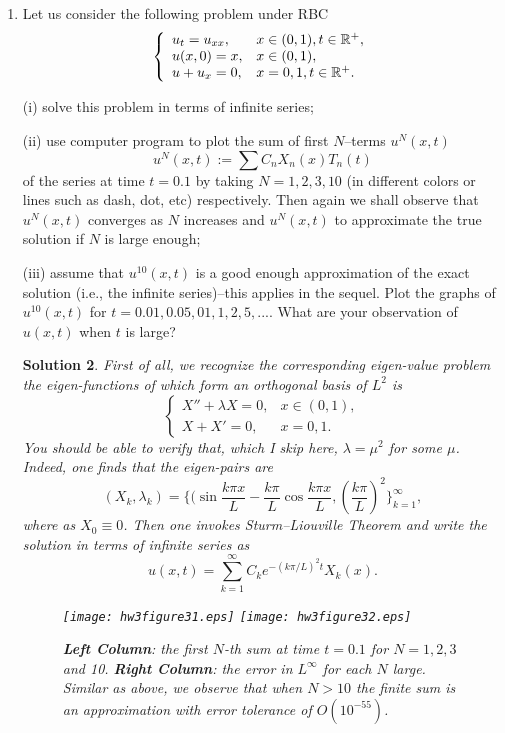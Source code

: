 \documentclass[6pt]{article}
\newtheorem{solution}{Solution}
\numberwithin{equation}{section}
\def\mathbb{\Bbb}
\begin{document}
\begin{enumerate}
\begin{solution}
I would like to comment that this explicit solution is available for this particular utility function, and in general, the PDE or HJB system can not be solved explicitly, at least NOT by the method of separation of variables.
\end{solution}



\item  Let us consider the following problem under RBC
\begin{equation}\label{NBVP1}
\left\{
\begin{array}{ll}
u_t=u_{xx},& x\in (0,1), t\in\mathbb R^+,\\
u(x,0)=x, &x\in(0,1), \\
u+u_x=0, & x=0,1, t\in\mathbb R^+.
\end{array}
\right.
\end{equation}

(i)  solve this problem in terms of infinite series;

(ii) use computer program to plot the sum of first $N$--terms $u^N(x,t)$
\[u^N(x,t):=\sum C_nX_n(x)T_n(t)\]
of the series at time $t=0.1$ by taking $N=1, 2, 3, 10$ (in different colors or lines such as dash, dot, etc) respectively.  Then again we shall observe that $u^N(x,t)$ converges as $N$ increases and $u^N(x,t)$ to approximate the true solution if $N$ is large enough;

(iii) assume that $u^{10}(x,t)$ is a good enough approximation of the exact solution (i.e., the infinite series)--this applies in the
sequel.  Plot the graphs of $u^{10}(x,t)$ for $t=0.01,0.05,01,1,2,5,...$.   What are your observation of $u(x,t)$ when $t$ is large?
\begin{solution}
First of all, we recognize the corresponding eigen-value problem the eigen-functions of which form an orthogonal basis of $L^2$ is
\[
\left\{
\begin{array}{ll}
X''+\lambda X=0,& x\in (0,1),\\
X+X'=0, & x=0,1.
\end{array}
\right.
\]
You should be able to verify that, which I skip here, $\lambda=\mu^2$ for some $\mu$.  Indeed, one finds that the eigen-pairs are
\[(X_k,\lambda_k)=\Big\{\Big(\sin \frac{k\pi x}{L}-\frac{k\pi}{L}\cos \frac{k\pi x}{L},(\frac{k\pi}{L})^2\Big\}_{k=1}^\infty,\]
where as $X_0\equiv 0$.  Then one invokes Sturm--Liouville Theorem and write the solution in terms of infinite series as
\[u(x,t)=\sum_{k=1}^\infty C_ke^{-(k\pi/L)^2t}X_k(x).\]

\begin{figure}[h!]%
  \centering
\texttt{[image: hw3figure31.eps]}\hspace{-8mm}
\texttt{[image: hw3figure32.eps]}
\caption{\textbf{Left Column}: the first $N$-th sum at time $t=0.1$ for $N=1,2,3$ and 10.  \textbf{Right Column}: the error in $L^\infty$ for each $N$ large.  Similar as above, we observe that when $N>10$ the finite sum is an approximation with error tolerance of $O(10^{-55})$.}
\end{figure}


\end{solution}
\end{enumerate}
\end{document}
